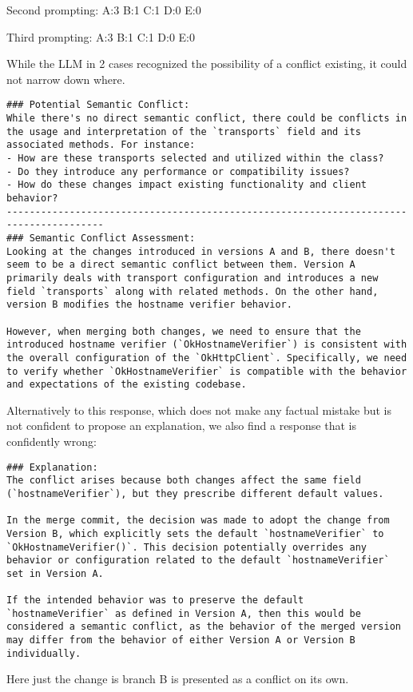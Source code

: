 Second prompting:
A:3
B:1
C:1
D:0
E:0

Third prompting:
A:3
B:1
C:1
D:0
E:0

While the LLM in 2 cases recognized the possibility of a conflict existing, it could not narrow down where.
\begin{lstlisting}
### Potential Semantic Conflict:
While there's no direct semantic conflict, there could be conflicts in the usage and interpretation of the `transports` field and its associated methods. For instance:
- How are these transports selected and utilized within the class?
- Do they introduce any performance or compatibility issues?
- How do these changes impact existing functionality and client behavior?
---------------------------------------------------------------------------------------
### Semantic Conflict Assessment:
Looking at the changes introduced in versions A and B, there doesn't seem to be a direct semantic conflict between them. Version A primarily deals with transport configuration and introduces a new field `transports` along with related methods. On the other hand, version B modifies the hostname verifier behavior.

However, when merging both changes, we need to ensure that the introduced hostname verifier (`OkHostnameVerifier`) is consistent with the overall configuration of the `OkHttpClient`. Specifically, we need to verify whether `OkHostnameVerifier` is compatible with the behavior and expectations of the existing codebase.
\end{lstlisting}
Alternatively to this response, which does not make any factual mistake but is not confident to propose an explanation, we also find a response that is confidently wrong:
\begin{lstlisting}
### Explanation:
The conflict arises because both changes affect the same field (`hostnameVerifier`), but they prescribe different default values.
   
In the merge commit, the decision was made to adopt the change from Version B, which explicitly sets the default `hostnameVerifier` to `OkHostnameVerifier()`. This decision potentially overrides any behavior or configuration related to the default `hostnameVerifier` set in Version A.
    
If the intended behavior was to preserve the default `hostnameVerifier` as defined in Version A, then this would be considered a semantic conflict, as the behavior of the merged version may differ from the behavior of either Version A or Version B individually.
\end{lstlisting}
Here just the change is branch B is presented as a conflict on its own.
